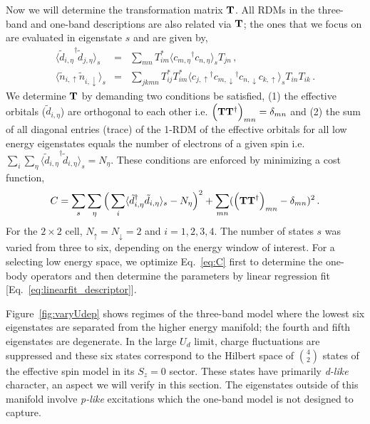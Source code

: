 Now we will determine the transformation matrix ${\bf T}$. All RDMs in the three-band and one-band descriptions are also related via ${\bf T}$; 
the ones that we focus on are evaluated in eigenstate $s$ and are given by,
\begin{subequations}
\begin{eqnarray}
	\langle {\tilde{d}_{i,\eta}}^{\dagger} \tilde{d}_{j,\eta} \rangle_{s} &=& \sum_{mn} T^{*}_{im} \langle {c_{m,\eta}}^{\dagger} c_{n,\eta} \rangle_{s} T_{jn} \label{eq:dmstransformations1} \,,\\
	\langle \tilde{n}_{i,\uparrow} \tilde{n}_{i,\downarrow} \rangle_{s} &=& \sum_{jkmn} T^{*}_{ij} T^{*}_{im} \langle {c_{j,\uparrow}}^{\dagger} {c_{m,\downarrow}}^{\dagger} c_{n,\downarrow} c_{k,\uparrow} \rangle_{s} T_{in} T_{ik}\,.
\label{eq:dmstransformations2}
\end{eqnarray}
\end{subequations}
We determine ${\bf T}$ by demanding two conditions be satisfied, (1) the effective orbitals ($\tilde{d}_{i,\eta}$) 
are orthogonal to each other i.e. $\Big({\bf T} {\bf T}^{\dagger}\Big)_{mn} = \delta_{mn}$
and (2) the sum of all diagonal entries (trace) of the 1-RDM of the effective orbitals for all low energy eigenstates 
equals the number of electrons of a given spin i.e. $\sum_{i} \sum_{\eta} \langle {\tilde{d}_{i,\eta}}^{\dagger} \tilde{d}_{i,\eta} \rangle_{s} = N_{\eta}$. 
These conditions are enforced by minimizing a cost function,
\begin{equation}
C = \sum_{s} \sum_{\eta} \Big( \sum_{i} \langle \tilde{d}_{i,\eta}^{\dagger} \tilde{d}_{i,\eta} \rangle_{s} - N_{\eta} \Big)^{2} + \sum_{mn} ( \Big({\bf T} {\bf T}^{\dagger}\Big)_{mn} -\delta_{mn})^{2}\,.
\label{eq:C}
\end{equation} 
For the $2\times2$ cell, $N_{\uparrow}=N_{\downarrow}=2$ and $i=1,2,3,4$. 
The number of states $s$ was varied from three to six, depending on the energy window of interest.  For a selecting low energy space, we optimize Eq.~\eqref{eq:C} first to determine the one-body operators and then determine the parameters by linear regression fit [Eq.~\eqref{eq:linearfit_descriptor}].

Figure~\ref{fig:varyUdep} shows regimes of the three-band model where 
the lowest six eigenstates are separated from the higher energy manifold; the 
fourth and fifth eigenstates are degenerate. 
In the large $U_d$ limit, charge fluctuations are suppressed and these six 
states correspond to the Hilbert space of $4 \choose 2$ states of the effective spin model in its $S_z=0$ sector.
These states have primarily \textit{d-like} character, an aspect we will verify in this section. 
The eigenstates outside of this manifold involve \textit{p-like} excitations which the one-band model is not designed 
to capture. 

